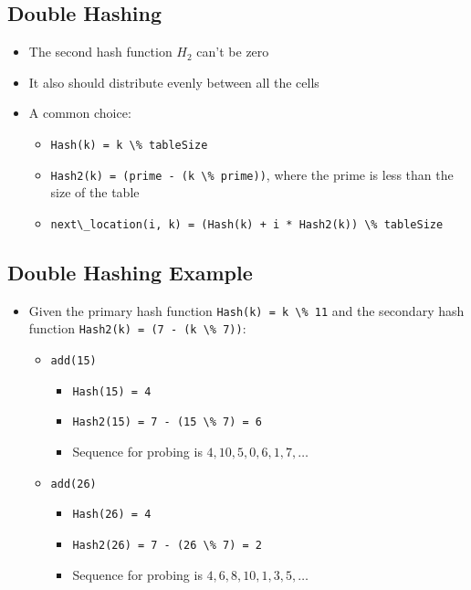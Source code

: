 \documentclass[
  10pt,
  english,
  letterpaper,
,tablecaptionabove
]{scrartcl}
\newcommand{\passthrough}[1]{#1}
\providecommand{\tightlist}{%
  \setlength{\itemsep}{0pt}\setlength{\parskip}{0pt}}
\begin{document}
\hypertarget{double-hashing}{%
\subsection{Double Hashing}\label{double-hashing}}

\begin{itemize}
\tightlist
\item
  The second hash function \(H_2\) can't be zero
\item
  It also should distribute evenly between all the cells
\item
  A common choice:

  \begin{itemize}
  \tightlist
  \item
    \passthrough{\lstinline!Hash(k) = k \% tableSize!}
  \item
    \passthrough{\lstinline!Hash2(k) = (prime - (k \% prime))!}, where
    the prime is less than the size of the table
  \item
    \passthrough{\lstinline!next\_location(i, k) = (Hash(k) + i * Hash2(k)) \% tableSize!}
  \end{itemize}
\end{itemize}

\hypertarget{double-hashing-example}{%
\subsection{Double Hashing Example}\label{double-hashing-example}}

\begin{itemize}
\tightlist
\item
  Given the primary hash function
  \passthrough{\lstinline!Hash(k) = k \% 11!} and the secondary hash
  function \passthrough{\lstinline!Hash2(k) = (7 - (k \% 7))!}:

  \begin{itemize}
  \tightlist
  \item
    \passthrough{\lstinline!add(15)!}

    \begin{itemize}
    \tightlist
    \item
      \passthrough{\lstinline!Hash(15) = 4!}
    \item
      \passthrough{\lstinline!Hash2(15) = 7 - (15 \% 7) = 6!}
    \item
      Sequence for probing is \(4, 10, 5, 0, 6, 1, 7, \dots\)
    \end{itemize}
  \item
    \passthrough{\lstinline!add(26)!}

    \begin{itemize}
    \tightlist
    \item
      \passthrough{\lstinline!Hash(26) = 4!}
    \item
      \passthrough{\lstinline!Hash2(26) = 7 - (26 \% 7) = 2!}
    \item
      Sequence for probing is \(4, 6, 8, 10, 1, 3, 5, \dots\)
    \end{itemize}
  \end{itemize}
\end{itemize}
\end{document}

